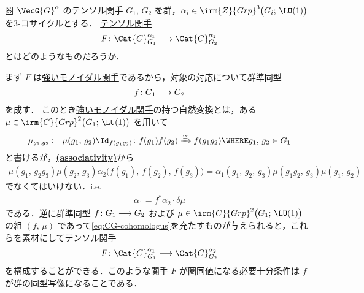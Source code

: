 \documentclass[TQFT_main]{subfiles}
\begin{document}
\begin{myexample}[label=def:CG-functor]{圏 $\VecG{G}^\alpha$ のテンソル関手}
    $G_1,\, G_2$ を群，$\alpha_i \in \irm{Z}{Grp}^3 \bigl(G_i;\, \LU(1) \bigr)$ を3-コサイクルとする．
    \hyperref[def:tensor-functor]{テンソル関手} 
    \begin{align}
        F \colon \Cat{C}_{G_1}^{\alpha_1} \lto \Cat{C}_{G_2}^{\alpha_2}
    \end{align}
    とはどのようなものだろうか．

    まず $F$ は\hyperref[redef:monidal-functor]{強いモノイダル関手}であるから，対象の対応について群準同型
    \begin{align}
        f \colon G_1 \longrightarrow G_2
    \end{align}
    を成す．
    このとき\hyperref[redef:monidal-functor]{強いモノイダル関手}の持つ自然変換とは，ある $\mu \in \irm{C}{Grp}^2 \bigl( G_1;\, \LU(1) \bigr) $ を用いて
    \begin{align}
        \mu_{g_1,g_2} \coloneqq \mu(g_1,\, g_2) \Id_{f(g_1 g_2)} \colon f(g_1) f(g_2) \xrightarrow{\cong} f(g_1g_2) \WHERE g_1,\, g_2 \in G_1
    \end{align}
    と書けるが，\hyperref[redef:monidal-functor]{\textsf{\textbf{(associativity)}}}から
    \begin{align}
        \mu(g_1,\, g_2 g_3) \mu(g_2,\, g_3) \alpha_2 \bigl( f(g_1),\, f(g_2),\, f(g_3) \bigr) = \alpha_1 (g_1,\, g_2,\, g_3) \mu(g_1g_2,\, g_3) \mu(g_1,\, g_2)
    \end{align}
    でなくてはいけない．i.e. 
    \begin{align}
        \label{eq:CG-cohomologus}
        \alpha_1 = f^* \alpha_2 \cdot \delta \mu
    \end{align}
    である．逆に群準同型 $f \colon G_1 \longrightarrow G_2$ および $\mu \in \irm{C}{Grp}^2 \bigl( G_1;\, \LU(1) \bigr)$ の組 $(f,\, \mu)$ であって\eqref{eq:CG-cohomologus}を充たすものが与えられると，これらを素材にして\hyperref[def:tensor-functor]{テンソル関手} 
    \begin{align}
        F \colon \Cat{C}_{G_1}^{\alpha_1} \lto \Cat{C}_{G_2}^{\alpha_2}
    \end{align}
    を構成することができる．このような関手 $F$ が圏同値になる必要十分条件は $f$ が群の同型写像になることである．
\end{myexample}
\end{document}
